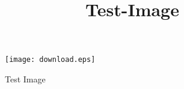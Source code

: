 \documentclass[12pt, a4paper]{article} %
\begin{document}
\title{Test-Image}
\begin{figure}[h]
	\centering
	\texttt{[image: download.eps]}
	\caption{Test Image}
	\label{fig:Test Image}
\end{figure}
\end{document}
